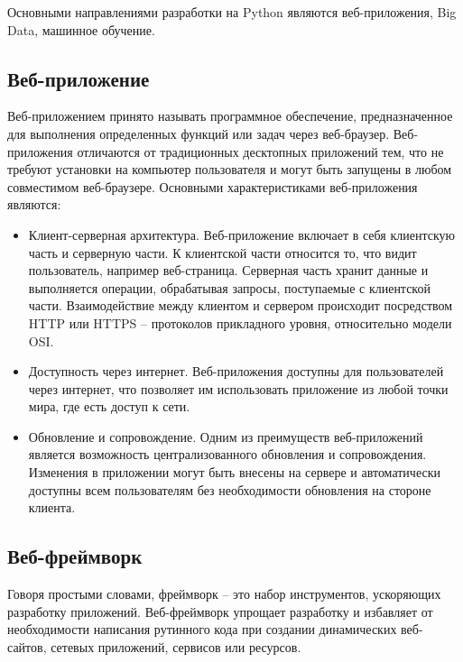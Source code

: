 Основными направлениями разработки на Python являются веб-приложения, Big Data, машинное обучение.


\subsection{Веб-приложение}\label{subsec:domain:web-application}
Веб-приложением принято называть программное обеспечение, предназначенное для выполнения определенных функций или задач через веб-браузер.
Веб-приложения отличаются от традиционных десктопных приложений тем, что не требуют установки на компьютер пользователя и могут быть запущены в любом совместимом веб-браузере.
Основными характеристиками веб-приложения являются:
\begin{itemize}
    \item Клиент-серверная архитектура.
    Веб-приложение включает в себя клиентскую часть и серверную части.
    К клиентской части относится то, что видит пользователь, например веб-страница.
    Серверная часть хранит данные и выполняется операции, обрабатывая запросы, поступаемые с клиентской части.
    Взаимодействие между клиентом и сервером происходит посредством HTTP или HTTPS -- протоколов прикладного уровня, относительно модели OSI.
    \item Доступность через интернет.
    Веб-приложения доступны для пользователей через интернет, что позволяет им использовать приложение из любой точки мира, где есть доступ к сети.
    \item Обновление и сопровождение.
    Одним из преимуществ веб-приложений является возможность централизованного обновления и сопровождения.
    Изменения в приложении могут быть внесены на сервере и автоматически доступны всем пользователям без необходимости обновления на стороне клиента.
\end{itemize}


\subsection{Веб-фреймворк}\label{subsec:domain:web-framework}
Говоря простыми словами, фреймворк -- это набор инструментов, ускоряющих разработку приложений.
Веб-фреймворк упрощает разработку и избавляет от необходимости написания рутинного кода при создании динамических веб-сайтов, сетевых приложений, сервисов или ресурсов.

